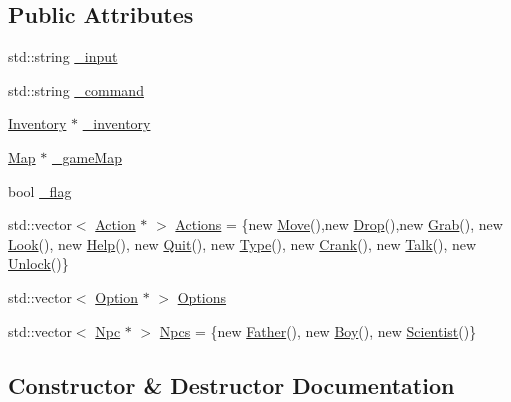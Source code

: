 \subsection*{Public Attributes}
\begin{DoxyCompactItemize}
\item 
std\+::string \mbox{\hyperlink{class_console_a35910060c8108bde054402ddc3f1a368}{\+\_\+input}}
\item 
std\+::string \mbox{\hyperlink{class_console_aaef25555f0862019ff368aa355432299}{\+\_\+command}}
\item 
\mbox{\hyperlink{class_inventory}{Inventory}} $\ast$ \mbox{\hyperlink{class_console_af9944cd5894644b7b49579a100be5beb}{\+\_\+inventory}}
\item 
\mbox{\hyperlink{class_map}{Map}} $\ast$ \mbox{\hyperlink{class_console_a726e7819b5fed6c9cb636280854bd3b4}{\+\_\+game\+Map}}
\item 
bool \mbox{\hyperlink{class_console_afd8769b6be561615f0cd4bd48bbd8278}{\+\_\+flag}}
\item 
std\+::vector$<$ \mbox{\hyperlink{class_action}{Action}} $\ast$ $>$ \mbox{\hyperlink{class_console_adc7d72b09dbe902005377881fdee16e0}{Actions}} = \{new \mbox{\hyperlink{class_move}{Move}}(),new \mbox{\hyperlink{class_drop}{Drop}}(),new \mbox{\hyperlink{class_grab}{Grab}}(), new \mbox{\hyperlink{class_look}{Look}}(), new \mbox{\hyperlink{class_help}{Help}}(), new \mbox{\hyperlink{class_quit}{Quit}}(), new \mbox{\hyperlink{class_type}{Type}}(), new \mbox{\hyperlink{class_crank}{Crank}}(), new \mbox{\hyperlink{class_talk}{Talk}}(), new \mbox{\hyperlink{class_unlock}{Unlock}}()\}
\item 
std\+::vector$<$ \mbox{\hyperlink{class_option}{Option}} $\ast$ $>$ \mbox{\hyperlink{class_console_a42e89a153b1782cc15d6b4cb50434802}{Options}}
\item 
std\+::vector$<$ \mbox{\hyperlink{class_npc}{Npc}} $\ast$ $>$ \mbox{\hyperlink{class_console_aaaf6dabe3be6d08c6d24df8a498b20a4}{Npcs}} = \{new \mbox{\hyperlink{class_father}{Father}}(), new \mbox{\hyperlink{class_boy}{Boy}}(), new \mbox{\hyperlink{class_scientist}{Scientist}}()\}
\end{DoxyCompactItemize}


\subsection{Constructor \& Destructor Documentation}
\mbox{\label{class_console_ac9b6509da71c28ff64a4112b369c4143}} 
